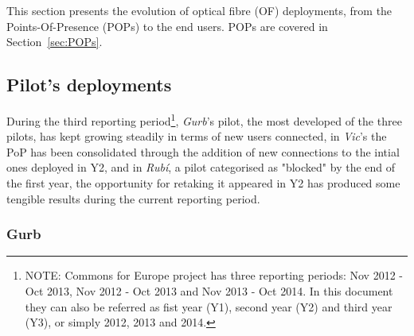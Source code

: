 This section presents the evolution of optical fibre (OF) deployments, from the Points-Of-Presence (POPs) to the end users. POPs are covered in Section~\ref{sec:POPs}.

\subsection{Pilot's deployments}
\label{dep_pilots}

During the third reporting period\footnote{NOTE: Commons for Europe project has three reporting periods: Nov 2012 - Oct 2013, Nov 2012 - Oct 2013 and Nov 2013 - Oct 2014. In this document they can also be referred as fist year (Y1), second year (Y2) and third year (Y3), or simply 2012, 2013 and 2014.}, \emph{Gurb}'s pilot, the most developed of the three pilots, has kept growing steadily in terms of new users connected, in \emph{Vic}'s the PoP has been consolidated through the addition of new connections to the intial ones deployed in Y2, and in \emph{Rub\'{i}}, a pilot categorised as "blocked" by the end of the first year, the opportunity for retaking it appeared in Y2 has produced some tengible results during the current reporting period.


\FloatBarrier

\subsubsection{Gurb}
\label{dep_gurb}

